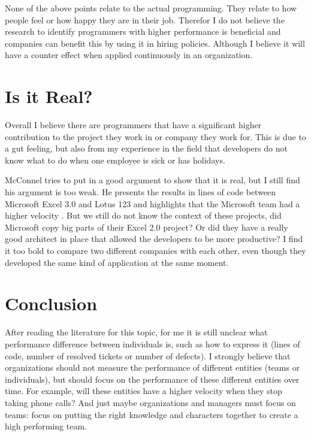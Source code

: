 None of the above points relate to the actual programming.
They relate to how people feel or how happy they are in their job.
Therefor I do not believe the research to identify programmers with higher performance is beneficial and companies can benefit this by using it in hiring policies.
Although I believe it will have a counter effect when applied continuously in an organization.

\section*{Is it Real?}

Overall I believe there are programmers that have a significant higher contribution to the project they work in or company they work for.
This is due to a gut feeling, but also from my experience in the field that developers do not know what to do when one employee is sick or has holidays.

McConnel tries to put in a good argument to show that it is real, but I still find his argument is too weak.
He presents the results in lines of code between Microsoft Excel 3.0 and Lotus 123 and highlights that the Microsoft team had a higher velocity \autocite[572]{MAKING_SOFTWARE}.
But we still do not know the context of these projects, did Microsoft copy big parts of their Excel 2.0 project?
Or did they have a really good architect in place that allowed the developers to be more productive?
I find it too bold to compare two different companies with each other, even though they developed the same kind of application at the same moment.

\section*{Conclusion}

After reading the literature for this topic, for me it is still unclear what performance difference between individuals is,
such as how to express it (lines of code, number of resolved tickets or number of defects).
I strongly believe that organizations should not measure the performance of different entities (teams or individuals),
but should focus on the performance of these different entities over time.
For example, will these entities have a higher velocity when they stop taking phone calls?
And just maybe organizations and managers must focus on teams: focus on putting the right knowledge and characters together to create a high performing team.